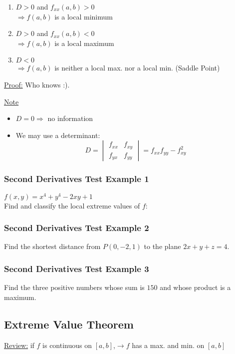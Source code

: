 \documentclass[12pt]{article}
\begin{document}
\fbox{
	\begin{minipage}{3.5in}
		\[
		D = D(a,b) = f_{xx}(a,b)f_{yy}(a,b) - [f_{xy}(a,b)]^2
		\]
	\end{minipage}
}

\begin{enumerate}
	\item \(D>0\) and \(f_{xx}(a,b) > 0\) \\
		\(\Rightarrow f(a,b)\) is a local minimum
	\item \(D>0\) and \(f_{xx}(a,b) < 0\)\\
		\(\Rightarrow f(a,b)\) is a local maximum
	\item \(D<0\) \\
		\(\Rightarrow f(a,b)\) is neither a local max. nor a local min. (Saddle Point)
\end{enumerate}

\underline{Proof:} Who knows :).

\underline{Note}
\begin{itemize}
	\item \(D=0 \Rightarrow \) no information
	\item We may use a determinant: 
		\[
			 D =
			\begin{vmatrix}
				f_{xx} & f_{xy} \\
				f_{yx} & f_{yy}
			\end{vmatrix}
			= f_{xx} f_{yy} - f_{xy}^2
		\]
\end{itemize}

\subsubsection{Second Derivatives Test Example 1}
\(f(x,y) = x^4 + y^4 -2xy + 1\) \\
Find and classify the local extreme values of \(f\): 

\subsubsection{Second Derivatives Test Example 2}
Find the shortest distance from \(P(0,-2,1)\) to the plane \(2x + y + z = 4\).

\subsubsection{Second Derivatives Test Example 3}
Find the three positive numbers whose sum is \(150\) and whose product is a maximum.


\subsection{Extreme Value Theorem}
\underline{Review:} if \(f\) is continuous on \([a,b]\),\(\rightarrow  f\) has a max. and min. on \([a,b]\)  
\end{document}
